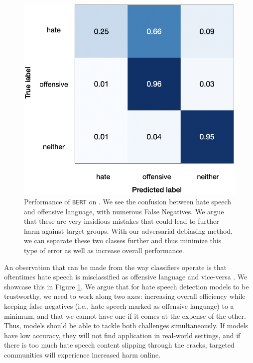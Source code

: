 \documentclass[11pt]{article}
\begin{document}
	\begin{figure}[t!]
		\centering
		\includegraphics[scale=0.475]{BERT_classifier.png}
		\caption{Performance of \texttt{BERT} on \citet{davidson}. We see the confusion between hate speech and offensive language, with numerous False Negatives. We argue that these are very insidious mistakes that could lead to further harm against target groups. With our adversarial debiasing method, we can separate these two classes further and thus minimize this type of error as well as increase overall performance.}
		\label{pitch}
	\end{figure}
	
	An observation that can be made from the way classifiers operate is that oftentimes hate speech is misclassified as offensive language and vice-versa \cite{davidson,mozafari2019bert}. We showcase this in Figure \ref{pitch}. We argue that for hate speech detection models to be trustworthy, we need to work along two axes: increasing overall efficiency while keeping false negatives (i.e., hate speech marked as offensive language) to a minimum, and that we cannot have one if it comes at the expense of the other. Thus, models should be able to tackle both challenges simultaneously. If models have low accuracy, they will not find application in real-world settings, and if there is too much hate speech content slipping through the cracks, targeted communities will experience increased harm online.
	
\end{document}
